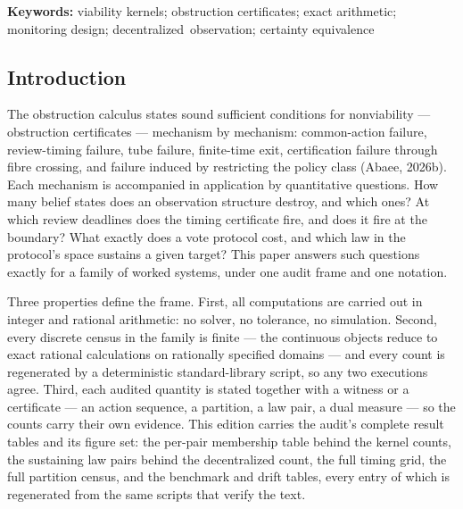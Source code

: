 \documentclass[10pt,twocolumn]{article}
\theoremstyle{definition}
\begin{document}
\begin{abstract}
with a rational dual certificate of margin \(3/50\). Static duality
holds at value \(-1/10\) on the two-floor instance with an \(\ell_1\)-normalized
Farkas pair, and a Helly-tight triple exhibits the sparse \(m{+}1\)-constraint witness. The complete result tables are carried here: the master table
of all 36 belief pairs against the five kernels, the sixteen sustaining
law pairs of the decentralized protocol (an exact \(4 \times 4\)
product), the 48-cell timing grid, the fifteen-partition census with
each fibre's common safe-action set, and the benchmark and drift tables,
with a five-figure set regenerated from the same scripts. Design rules
follow: review deadlines are boundary-inclusive; merged fibres call for
splits, not threshold tuning; aggregated indices support certainly-safe
reporting only; biased observation maps call for structural correction.
\end{abstract}

\textbf{Keywords:} viability kernels; obstruction certificates; exact
arithmetic; monitoring design; \mbox{decentralized observation}; certainty
equivalence

\subsection{Introduction}\label{introduction}

The obstruction calculus states sound sufficient conditions for
nonviability --- obstruction certificates --- mechanism by mechanism:
common-action failure, review-timing failure, tube failure, finite-time
exit, certification failure through fibre crossing, and failure induced
by restricting the policy class (Abaee, 2026b). Each mechanism is
accompanied in application by quantitative questions. How many belief
states does an observation structure destroy, and which ones? At which
review deadlines does the timing certificate fire, and does it fire at
the boundary? What exactly does a vote protocol cost, and which law in
the protocol's space sustains a given target? This paper answers such
questions exactly for a family of worked systems, under one audit frame
and one notation.

Three properties define the frame. First, all computations are carried
out in integer and rational arithmetic: no solver, no tolerance, no
simulation. Second, every discrete census in the family is finite --- the continuous objects reduce to exact rational calculations on rationally specified domains --- and every count is regenerated by a deterministic standard-library script, so any two executions agree. Third, each audited quantity is stated together with a
witness or a certificate --- an action sequence, a partition, a law
pair, a dual measure --- so the counts carry their own evidence. This
edition carries the audit's complete result tables and its figure set:
the per-pair membership table behind the kernel counts, the sustaining
law pairs behind the decentralized count, the full timing grid, the full
partition census, and the benchmark and drift tables, every entry of
which is regenerated from the same scripts that verify the text.
\end{document}
